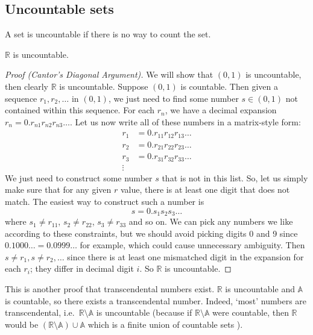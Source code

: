 \subsection{Uncountable sets}
\begin{definition}
	A set is uncountable if there is no way to count the set.
\end{definition}
\begin{theorem}
	\(\mathbb R\) is uncountable.
\end{theorem}
\begin{proof}[Proof (Cantor's Diagonal Argument)]
	We will show that \((0, 1)\) is uncountable, then clearly \(\mathbb R\) is uncountable.
	Suppose \((0, 1)\) is countable.
	Then given a sequence \(r_1, r_2, \dots\) in \((0, 1)\), we just need to find some number \(s \in (0, 1)\) not contained within this sequence.
	For each \(r_n\), we have a decimal expansion \(r_n = 0.r_{n1}r_{n2}r_{n3}\dots\).
	Let us now write all of these numbers in a matrix-style form:
	\begin{align*}
		r_1 & = 0.r_{11}r_{12}r_{13}\dots \\
		r_2 & = 0.r_{21}r_{22}r_{23}\dots \\
		r_3 & = 0.r_{31}r_{32}r_{33}\dots \\
		\vdots
	\end{align*}
	We just need to construct some number \(s\) that is not in this list.
	So, let us simply make sure that for any given \(r\) value, there is at least one digit that does not match.
	The easiest way to construct such a number is
	\[
		s = 0.s_1 s_2 s_3 \dots
	\]
	where \(s_1 \neq r_{11}\), \(s_2 \neq r_{22}\), \(s_3 \neq r_{33}\) and so on.
	We can pick any numbers we like according to these constraints, but we should avoid picking digits 0 and 9 since \(0.1000\dots = 0.0999\dots\) for example, which could cause unnecessary ambiguity.
	Then \(s \neq r_1, s \neq r_2, \dots\) since there is at least one mismatched digit in the expansion for each \(r_i\); they differ in decimal digit \(i\).
	So \(\mathbb R\) is uncountable.
\end{proof}
This is another proof that transcendental numbers exist.
\(\mathbb R\) is uncountable and \(\mathbb A\) is countable, so there exists a transcendental number.
Indeed, `most' numbers are transcendental, i.e.\ \(\mathbb R \setminus \mathbb A\) is uncountable (because if \(\mathbb R \setminus \mathbb A\) were countable, then \(\mathbb R\) would be \((\mathbb R \setminus \mathbb A) \cup \mathbb A\) which is a finite union of countable sets \contradiction).
